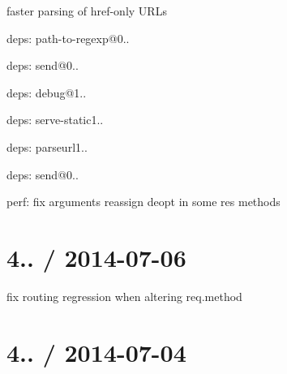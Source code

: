 \begin{DoxyItemize}
\begin{DoxyItemize}
\item faster parsing of href-\/only U\+R\+Ls
\end{DoxyItemize}
\item deps\+: path-\/to-\/regexp@0..
\item deps\+: send@0..
\begin{DoxyItemize}
\item deps\+: debug@1..
\end{DoxyItemize}
\item deps\+: serve-\/static1..
\begin{DoxyItemize}
\item deps\+: parseurl1..
\item deps\+: send@0..
\end{DoxyItemize}
\item perf\+: fix arguments reassign deopt in some {\ttfamily res} methods
\end{DoxyItemize}

\section*{4.. / 2014-\/07-\/06 }


\begin{DoxyItemize}
\item fix routing regression when altering {\ttfamily req.\+method}
\end{DoxyItemize}

\section*{4.. / 2014-\/07-\/04 }


